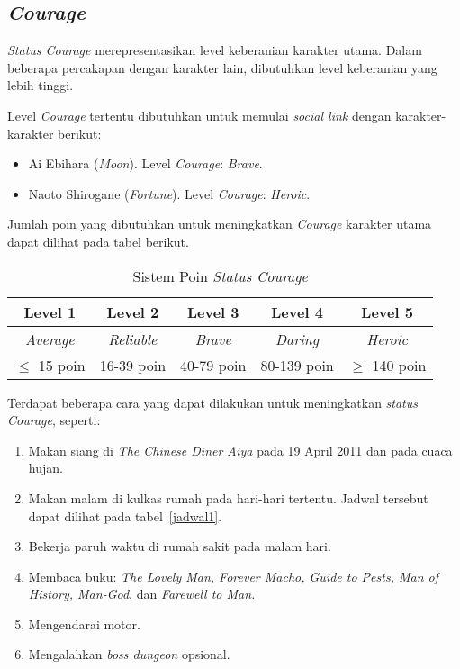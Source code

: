 \subsection{\textit{Courage}}
\textit{Status Courage} merepresentasikan level keberanian karakter utama. Dalam beberapa percakapan dengan karakter lain, dibutuhkan level keberanian yang lebih tinggi.

Level \textit{Courage} tertentu dibutuhkan untuk memulai \textit{social link} dengan karakter-karakter berikut:
\begin{itemize}
    \item Ai Ebihara (\textit{Moon}). Level \textit{Courage}: \textit{Brave}.
    \item Naoto Shirogane (\textit{Fortune}). Level \textit{Courage}: \textit{Heroic}.
\end{itemize}

Jumlah poin yang dibutuhkan untuk meningkatkan \textit{Courage} karakter utama dapat dilihat pada tabel berikut.
\begin{table}[htb]
    \begin{center}
        \begin{tabular}{ | c | c | c | c | c | }
            \hline
            Level 1          & Level 2           & Level 3        & Level 4         & Level 5         \\
            \hline
            \textit{Average} & \textit{Reliable} & \textit{Brave} & \textit{Daring} & \textit{Heroic} \\
            \hline
            $\le$ 15 poin    & 16-39 poin        & 40-79 poin     & 80-139 poin     & $\ge$ 140 poin  \\
            \hline
        \end{tabular}
    \end{center}
    \caption{Sistem Poin \textit{Status Courage}}
\end{table}

Terdapat beberapa cara yang dapat dilakukan untuk meningkatkan \textit{status Courage}, seperti:
\begin{enumerate}
    \item Makan siang di \textit{The Chinese Diner Aiya} pada 19 April 2011 dan pada cuaca hujan.
    \item Makan malam di kulkas rumah pada hari-hari tertentu. Jadwal tersebut dapat dilihat pada tabel~\ref{jadwal1}.
    \item Bekerja paruh waktu di rumah sakit pada malam hari.
    \item Membaca buku: \textit{The Lovely Man, Forever Macho, Guide to Pests, Man of History, Man-God}, dan \textit{Farewell to Man.}
    \item Mengendarai motor.
    \item Mengalahkan \textit{boss dungeon} opsional.
\end{enumerate}

